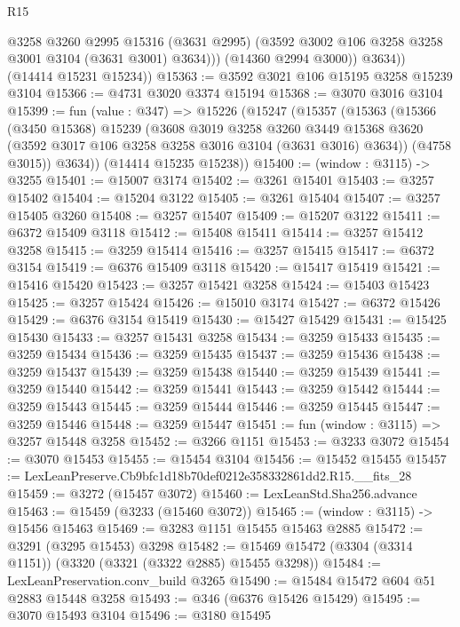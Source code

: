 \begin{lexlean}{R15}
\begin{coremodule}
                @3258
                @3260
                @2995
                @15316
                (@3631 @2995)
                (@3592 @3002 @106 @3258 @3258 @3001 @3104 (@3631 @3001) @3634)))
            (@14360 @2994 @3000))
          @3634))
      (@14414 @15231 @15234))
@15363 := @3592 @3021 @106 @15195 @3258 @15239 @3104
@15366 := @4731 @3020 @3374 @15194
@15368 := @3070 @3016 @3104
@15399 := fun (value : @347) =>
  @15226
    (@15247
      (@15357
        (@15363
          (@15366
            (@3450 @15368)
            @15239
            (@3608
              @3019
              @3258
              @3260
              @3449
              @15368
              @3620
              (@3592 @3017 @106 @3258 @3258 @3016 @3104 (@3631 @3016) @3634))
            (@4758 @3015))
          @3634))
      (@14414 @15235 @15238))
@15400 := (window : @3115) -> @3255
@15401 := @15007 @3174
@15402 := @3261 @15401
@15403 := @3257 @15402
@15404 := @15204 @3122
@15405 := @3261 @15404
@15407 := @3257 @15405 @3260
@15408 := @3257 @15407
@15409 := @15207 @3122
@15411 := @6372 @15409 @3118
@15412 := @15408 @15411
@15414 := @3257 @15412 @3258
@15415 := @3259 @15414
@15416 := @3257 @15415
@15417 := @6372 @3154
@15419 := @6376 @15409 @3118
@15420 := @15417 @15419
@15421 := @15416 @15420
@15423 := @3257 @15421 @3258
@15424 := @15403 @15423
@15425 := @3257 @15424
@15426 := @15010 @3174
@15427 := @6372 @15426
@15429 := @6376 @3154 @15419
@15430 := @15427 @15429
@15431 := @15425 @15430
@15433 := @3257 @15431 @3258
@15434 := @3259 @15433
@15435 := @3259 @15434
@15436 := @3259 @15435
@15437 := @3259 @15436
@15438 := @3259 @15437
@15439 := @3259 @15438
@15440 := @3259 @15439
@15441 := @3259 @15440
@15442 := @3259 @15441
@15443 := @3259 @15442
@15444 := @3259 @15443
@15445 := @3259 @15444
@15446 := @3259 @15445
@15447 := @3259 @15446
@15448 := @3259 @15447
@15451 := fun (window : @3115) => @3257 @15448 @3258
@15452 := @3266 @1151
@15453 := @3233 @3072
@15454 := @3070 @15453
@15455 := @15454 @3104
@15456 := @15452 @15455
@15457 := LexLeanPreserve.Cb9bfc1d18b70def0212e358332861dd2.R15.__fits_28
@15459 := @3272 (@15457 @3072)
@15460 := LexLeanStd.Sha256.advance
@15463 := @15459 (@3233 (@15460 @3072))
@15465 := (window : @3115) -> @15456 @15463
@15469 := @3283 @1151 @15455 @15463 @2885
@15472 := @3291 (@3295 @15453) @3298
@15482 := @15469 @15472 (@3304 (@3314 @1151)) (@3320 (@3321 (@3322 @2885) @15455 @3298))
@15484 := LexLeanPreservation.conv_build @3265
@15490 := @15484 @15472 @604 @51 @2883 @15448 @3258
@15493 := @346 (@6376 @15426 @15429)
@15495 := @3070 @15493 @3104
@15496 := @3180 @15495

\end{coremodule}
\end{lexlean}
